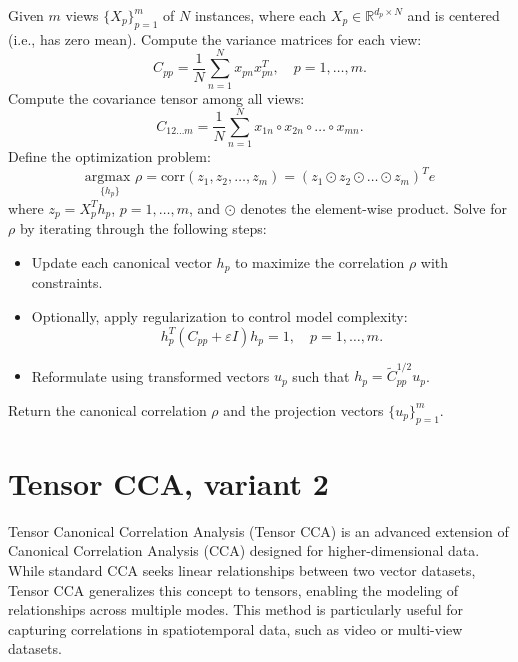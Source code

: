 \documentclass[a4paper,14pt]{article}
\renewcommand{\epsilon}{\ensuremath{\varepsilon}}
\theoremstyle{plain} %
\theoremstyle{definition} %
\theoremstyle{remark} %
\theoremstyle{definition}
\theoremstyle{remark}
\theoremstyle{remark}
\begin{document}
	\begin{algorithm}
		\caption{Tensor Canonical Correlation Analysis (TCCA)}
		\label{alg:TCCA}
		\begin{algorithmic}
			\State Given $m$ views $\{X_p\}_{p=1}^m$ of $N$ instances, where each $X_p \in \mathbb{R}^{d_p \times N}$ and is centered (i.e., has zero mean).
			\State Compute the variance matrices for each view:
			\[
			C_{pp} = \frac{1}{N} \sum_{n=1}^N x_{pn} x_{pn}^T, \quad p = 1, \dots, m.
			\]
			\State Compute the covariance tensor among all views:
			\[
			C_{12\ldots m} = \frac{1}{N} \sum_{n=1}^N x_{1n} \circ x_{2n} \circ \dots \circ x_{mn}.
			\]
			\State Define the optimization problem:
			\[
			\underset{\{h_p\}}{\text{argmax }} \rho = \text{corr}(z_1, z_2, \ldots, z_m) = (z_1 \odot z_2 \odot \dots \odot z_m)^T e
			\]
			where $z_p = X_p^T h_p$, $p = 1, \dots, m$, and $\odot$ denotes the element-wise product.
			\State Solve for $\rho$ by iterating through the following steps:
			\begin{itemize}
				\item Update each canonical vector $h_p$ to maximize the correlation $\rho$ with constraints.
				\item Optionally, apply regularization to control model complexity:
				\[
				h_p^T (C_{pp} + \epsilon I) h_p = 1, \quad p = 1, \dots, m.
				\]
				\item Reformulate using transformed vectors $u_p$ such that $h_p = \tilde{C}_{pp}^{1/2} u_p$.
			\end{itemize}
			\State Return the canonical correlation $\rho$ and the projection vectors $\{u_p\}_{p=1}^m$.
			\EndProcedure
		\end{algorithmic}
	\end{algorithm}

	\section{Tensor CCA, variant 2}

	Tensor Canonical Correlation Analysis (Tensor CCA) is an advanced extension of Canonical Correlation Analysis (CCA) designed for higher-dimensional data. While standard CCA seeks linear relationships between two vector datasets, Tensor CCA generalizes this concept to tensors, enabling the modeling of relationships across multiple modes. This method is particularly useful for capturing correlations in spatiotemporal data, such as video or multi-view datasets.
	
\end{document}
